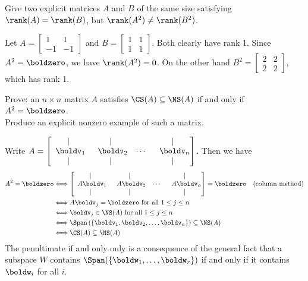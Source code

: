 \ii Give two explicit matrices $A$ and $B$ of the same size satisfying $\rank(A)=\rank(B)$, but $\rank(A^2)\ne \rank(B^2)$. 
\\
\begin{solution}
\noindent
Let $A=\begin{bmatrix}
1&1\\
-1&-1
\end{bmatrix}$ and $B=\begin{bmatrix}
1&1\\ 1&1
\end{bmatrix}$. Both clearly have rank 1. Since $A^2=\boldzero$, we have $\rank(A^2)=0$. On the other hand $B^2=\begin{bmatrix}
2&2\\ 2&2
\end{bmatrix}$, which has rank 1.    
\end{solution}
\ii Prove: an $n\times n$ matrix $A$ satisfies $\CS(A)\subseteq \NS(A)$ if and only if  $A^2=\boldzero$. 
\\
Produce an explicit nonzero example of such a matrix. 
\\
\begin{solution}
\noindent Write $A=\begin{bmatrix}
\vert &\vert & &\vert\\
\hspace{5pt} \boldv_1&\hspace{5pt}\boldv_2&\cdots &\hspace{5pt}\boldv_n\\
\vert &\vert & &\vert
\end{bmatrix}$. 
Then we have 
\begin{align*}
A^2=\boldzero 
&\Longleftrightarrow 
\begin{bmatrix}
\vert &\vert & &\vert\\
\hspace{5pt} A\boldv_1&\hspace{5pt}A\boldv_2&\cdots &\hspace{5pt}A\boldv_n\\
\vert &\vert & &\vert
\end{bmatrix}=\boldzero &\text{(column method)}\\
&\Longleftrightarrow A\boldv_j=\boldzero \text{ for all $1\leq j\leq n$} \\
&\Longleftrightarrow \boldv_j\in\NS(A) \text{ for all $1\leq j\leq n$}\\
&\Longleftrightarrow \Span\left(\{ \boldv_1,\boldv_2,\dots, \boldv_n\}\right)\subseteq\NS(A)\\
&\Longleftrightarrow \CS(A)\subseteq \NS(A)
\end{align*}  
The penultimate if and only only is a consequence of the general fact that a subspace $W$ contains $\Span(\{\boldw_1,\dots, \boldw_r\})$ if and only if it contains $\boldw_i$ for all $i$. 
\end{solution} 
